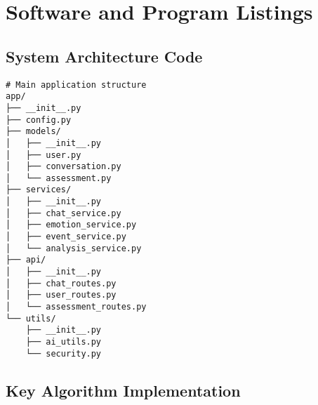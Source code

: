 \section{Software and Program Listings}
\label{sec:software}

\subsection{System Architecture Code}

\begin{verbatim}
# Main application structure
app/
├── __init__.py
├── config.py
├── models/
│   ├── __init__.py
│   ├── user.py
│   ├── conversation.py
│   └── assessment.py
├── services/
│   ├── __init__.py
│   ├── chat_service.py
│   ├── emotion_service.py
│   ├── event_service.py
│   └── analysis_service.py
├── api/
│   ├── __init__.py
│   ├── chat_routes.py
│   ├── user_routes.py
│   └── assessment_routes.py
└── utils/
    ├── __init__.py
    ├── ai_utils.py
    └── security.py
\end{verbatim}

\subsection{Key Algorithm Implementation}

